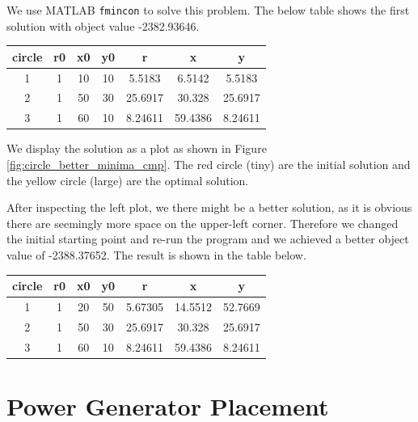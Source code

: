 We use MATLAB \texttt{fmincon} to solve this problem. The below table shows the first solution with object value -2382.93646.
\begin{center}
\begin{tabular}{c || c | c | c || c | c | c}
     circle & r0 & x0 & y0 & r & x & y \\
     \hline
     1     & 1  & 10 & 10 & 5.5183 & 6.5142 & 5.5183 \\
     2     & 1  & 50 & 30 & 25.6917 & 30.328 & 25.6917 \\
     3     & 1  & 60 & 10 & 8.24611 & 59.4386 & 8.24611 \\
\end{tabular}
\end{center}

We display the solution as a plot as shown in Figure \ref{fig:circle_better_minima_cmp}. The red circle (tiny) are the initial solution and the yellow circle (large) are the optimal solution.

After inspecting the left plot, we there might be a better solution, as it is obvious there are seemingly more space on the upper-left corner. Therefore we changed the initial starting point and re-run the program and we achieved a better object value of -2388.37652. The result is shown in the table below. 

\begin{center}
\begin{tabular}{c || c | c | c || c | c | c}
     circle & r0 & x0 & y0 & r & x & y \\
     \hline
     1     & 1  & 20 & 50 & 5.67305 & 14.5512 & 52.7669 \\
     2     & 1  & 50 & 30 & 25.6917 & 30.328 & 25.6917 \\
     3     & 1  & 60 & 10 & 8.24611 & 59.4386 & 8.24611 \\
\end{tabular}
\end{center}

\section{Power Generator Placement}

